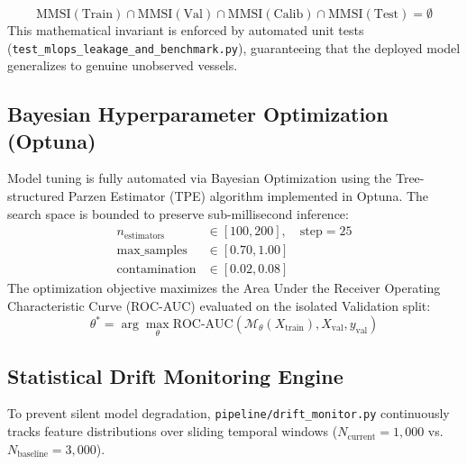 \begin{equation}
\text{MMSI}(\text{Train}) \cap \text{MMSI}(\text{Val}) \cap \text{MMSI}(\text{Calib}) \cap \text{MMSI}(\text{Test}) = \emptyset
\end{equation}
This mathematical invariant is enforced by automated unit tests (\texttt{test\_mlops\_leakage\_and\_benchmark.py}), guaranteeing that the deployed model generalizes to genuine unobserved vessels.

\subsection{Bayesian Hyperparameter Optimization (Optuna)}
Model tuning is fully automated via Bayesian Optimization using the Tree-structured Parzen Estimator (TPE) algorithm implemented in Optuna. The search space is bounded to preserve sub-millisecond inference:
\begin{align}
n_{\text{estimators}} &\in [100, 200], \quad \text{step} = 25 \\
\text{max\_samples} &\in [0.70, 1.00] \\
\text{contamination} &\in [0.02, 0.08]
\end{align}
The optimization objective maximizes the Area Under the Receiver Operating Characteristic Curve (ROC-AUC) evaluated on the isolated Validation split:
\begin{equation}
\theta^* = \arg\max_\theta \text{ROC-AUC}(\mathcal{M}_\theta(X_{\text{train}}), X_{\text{val}}, y_{\text{val}})
\end{equation}

\subsection{Statistical Drift Monitoring Engine}
To prevent silent model degradation, \texttt{pipeline/drift\_monitor.py} continuously tracks feature distributions over sliding temporal windows ($N_{\text{current}} = 1,000$ vs. $N_{\text{baseline}} = 3,000$).

